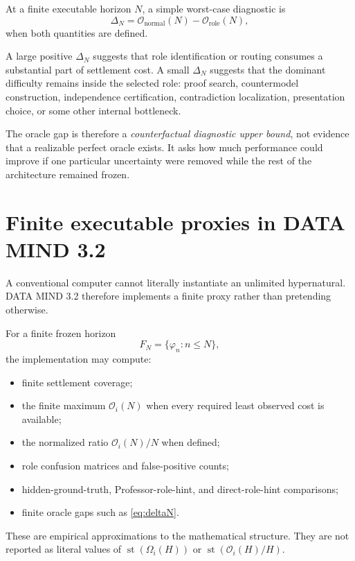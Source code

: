 \documentclass[11pt]{article}
\newcommand{\st}{\operatorname{st}}
\newcommand{\Ocal}{\mathcal{O}}
\begin{document}
At a finite executable horizon $N$, a simple worst-case diagnostic is
\begin{equation}
\Delta_N=
\Ocal_{\mathrm{normal}}(N)-
\Ocal_{\mathrm{role}}(N),
\label{eq:deltaN}
\end{equation}
when both quantities are defined.

A large positive $\Delta_N$ suggests that role identification or routing consumes a substantial part of settlement cost. A small $\Delta_N$ suggests that the dominant difficulty remains inside the selected role: proof search, countermodel construction, independence certification, contradiction localization, presentation choice, or some other internal bottleneck.

The oracle gap is therefore a \emph{counterfactual diagnostic upper bound}, not evidence that a realizable perfect oracle exists. It asks how much performance could improve if one particular uncertainty were removed while the rest of the architecture remained frozen.

\section{Finite executable proxies in DATA MIND 3.2}

A conventional computer cannot literally instantiate an unlimited hypernatural. DATA MIND 3.2 therefore implements a finite proxy rather than pretending otherwise.

For a finite frozen horizon
\begin{equation}
F_N=\{\varphi_n:n\le N\},
\end{equation}
the implementation may compute:
\begin{itemize}
\item finite settlement coverage;
\item the finite maximum $\Ocal_i(N)$ when every required least observed cost is available;
\item the normalized ratio $\Ocal_i(N)/N$ when defined;
\item role confusion matrices and false-positive counts;
\item hidden-ground-truth, Professor-role-hint, and direct-role-hint comparisons;
\item finite oracle gaps such as \eqref{eq:deltaN}.
\end{itemize}

These are empirical approximations to the mathematical structure. They are not reported as literal values of $\st(\Omega_i(H))$ or $\st(\Ocal_i(H)/H)$.
\end{document}
